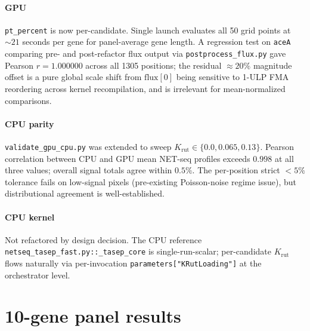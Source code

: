 \documentclass[11pt]{article}
\newcommand{\Krut}{K_{\text{rut}}}
\begin{document}
\paragraph{GPU} \texttt{pt\_percent} is now per-candidate. Single
launch evaluates all 50 grid points at $\sim 21$ seconds per gene for
panel-average gene length. A regression test on \texttt{aceA} comparing
pre- and post-refactor flux output via \texttt{postprocess\_flux.py}
gave Pearson $r = 1.000000$ across all 1305 positions; the residual
$\approx 20\%$ magnitude offset is a pure global scale shift from
$\text{flux}[0]$ being sensitive to 1-ULP FMA reordering across kernel
recompilation, and is irrelevant for mean-normalized comparisons.

\paragraph{CPU parity} \texttt{validate\_gpu\_cpu.py} was extended to
sweep $\Krut \in \{0.0, 0.065, 0.13\}$. Pearson correlation between
CPU and GPU mean NET-seq profiles exceeds $0.998$ at all three values;
overall signal totals agree within $0.5\%$. The per-position strict
$<5\%$ tolerance fails on low-signal pixels (pre-existing Poisson-noise
regime issue), but distributional agreement is well-established.

\paragraph{CPU kernel} Not refactored by design decision. The CPU
reference \texttt{netseq\_tasep\_fast.py::\_tasep\_core} is
single-run-scalar; per-candidate $\Krut$ flows naturally via
per-invocation \texttt{parameters["KRutLoading"]} at the orchestrator
level.

\section{10-gene panel results}
\label{sec:results}
\end{document}

